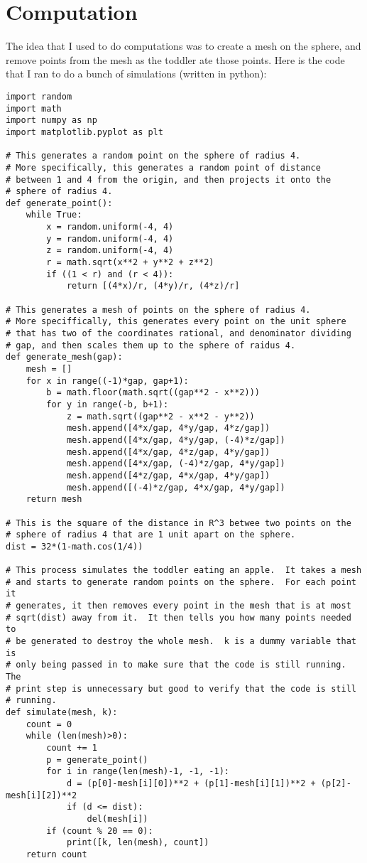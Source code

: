 \documentclass[11pt]{article}
\theoremstyle{definition}
\begin{document}
\section{Computation}
The idea that I used to do computations was to create a mesh on the sphere, and remove points from the mesh as the toddler ate those points.  Here is the code that I ran to do a bunch of simulations (written in python):
\begin{verbatim}
import random
import math
import numpy as np
import matplotlib.pyplot as plt

# This generates a random point on the sphere of radius 4.
# More specifically, this generates a random point of distance
# between 1 and 4 from the origin, and then projects it onto the
# sphere of radius 4.
def generate_point():
    while True:
        x = random.uniform(-4, 4)
        y = random.uniform(-4, 4)
        z = random.uniform(-4, 4)
        r = math.sqrt(x**2 + y**2 + z**2)
        if ((1 < r) and (r < 4)):
            return [(4*x)/r, (4*y)/r, (4*z)/r]

# This generates a mesh of points on the sphere of radius 4.
# More speciffically, this generates every point on the unit sphere
# that has two of the coordinates rational, and denominator dividing
# gap, and then scales them up to the sphere of raidus 4.
def generate_mesh(gap):
    mesh = []
    for x in range((-1)*gap, gap+1):
        b = math.floor(math.sqrt((gap**2 - x**2)))
        for y in range(-b, b+1):
            z = math.sqrt((gap**2 - x**2 - y**2))
            mesh.append([4*x/gap, 4*y/gap, 4*z/gap])
            mesh.append([4*x/gap, 4*y/gap, (-4)*z/gap])
            mesh.append([4*x/gap, 4*z/gap, 4*y/gap])
            mesh.append([4*x/gap, (-4)*z/gap, 4*y/gap])
            mesh.append([4*z/gap, 4*x/gap, 4*y/gap])
            mesh.append([(-4)*z/gap, 4*x/gap, 4*y/gap])
    return mesh

# This is the square of the distance in R^3 betwee two points on the
# sphere of radius 4 that are 1 unit apart on the sphere.
dist = 32*(1-math.cos(1/4))

# This process simulates the toddler eating an apple.  It takes a mesh
# and starts to generate random points on the sphere.  For each point it
# generates, it then removes every point in the mesh that is at most
# sqrt(dist) away from it.  It then tells you how many points needed to
# be generated to destroy the whole mesh.  k is a dummy variable that is
# only being passed in to make sure that the code is still running.  The
# print step is unnecessary but good to verify that the code is still
# running.
def simulate(mesh, k):
    count = 0
    while (len(mesh)>0):
        count += 1
        p = generate_point()
        for i in range(len(mesh)-1, -1, -1):
            d = (p[0]-mesh[i][0])**2 + (p[1]-mesh[i][1])**2 + (p[2]-mesh[i][2])**2
            if (d <= dist):
                del(mesh[i])
        if (count % 20 == 0):
            print([k, len(mesh), count])
    return count
    

\end{verbatim}
\end{document}
